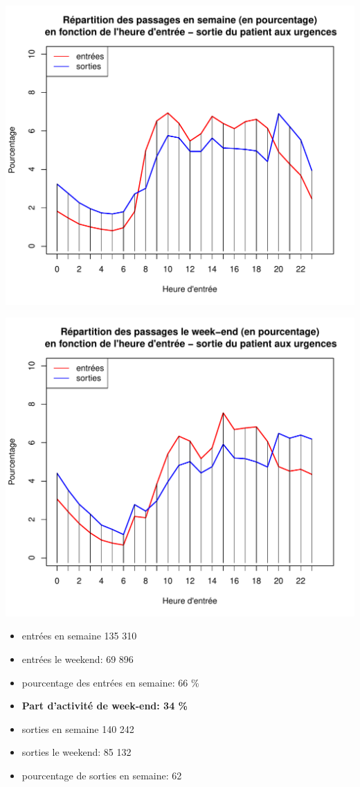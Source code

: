 \documentclass[12pt,english,french,twoside]{book}\usepackage[]{graphicx}\usepackage[]{color}
\makeatletter
\def\maxwidth{ %
  \ifdim\Gin@nat@width>\linewidth
    \linewidth
  \else
    \Gin@nat@width
  \fi
}
\newenvironment{knitrout}{}{} %
\makeatother
\begin{document}
\begin{knitrout}
\color{fgcolor}
\includegraphics[width=\maxwidth]{figure/es_we1} 

\includegraphics[width=\maxwidth]{figure/es_we2} 

\end{knitrout}


\begin{boxedminipage}{10cm}
\begin{itemize}
  \item entrées en semaine 135 310
  \item entrées le weekend: 69 896
  \item pourcentage des entrées en semaine: 66 \%
  \item \textbf{Part d'activité de week-end: 34 \%}
  \item sorties en semaine 140 242
  \item sorties le weekend: 85 132
  \item pourcentage de sorties en semaine: 62
\end{itemize}
\end{boxedminipage}
\end{document}
